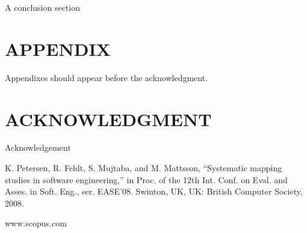 \documentclass[letterpaper, 10 pt, conference]{ieeeconf}  %
\begin{document}
A conclusion section 



\addtolength{\textheight}{-12cm}   








\section*{APPENDIX}

Appendixes should appear before the acknowledgment.

\section*{ACKNOWLEDGMENT}

Acknowledgement


\begin{thebibliography}{99}

 K. Petersen, R. Feldt, S. Mujtaba, and M. Mattsson, “Systematic mapping studies in software engineering,” in Proc. of the 12th Int. Conf. on Eval. and Asses. in Soft. Eng., ser. EASE’08. Swinton, UK, UK: British Computer Society, 2008.

 www.scopus.com









\end{thebibliography}
\end{document}
